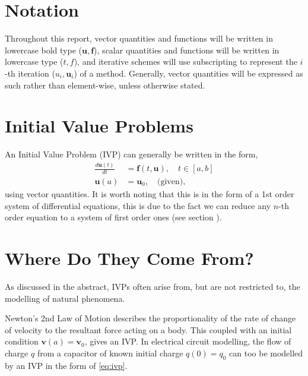 \documentclass[12pt, twoside]{report}
\theoremstyle{plain}
\theoremstyle{definition}
\theoremstyle{definition}
\begin{document}
    \section{Notation}
    \label{1_notation}
        Throughout this report, vector quantities and functions will be written
        in lowercase bold type ($\mathbf{u}, \mathbf{f}$), scalar quantities 
        and functions will be written in lowercase type ($t, f$), and iterative
        schemes will use subscripting to represent the $i$-th iteration 
        ($u_{i}, \mathbf{u}_i$) of a method. Generally, vector quantities will
        be expressed as such rather than element-wise, unless otherwise stated.


    \section{Initial Value Problems}
    \label{1_ivp}
        An Initial Value Problem (IVP) can generally be written in the form,
        \begin{equation}
        \label{eq:ivp}
            \begin{split}
                \frac{d \mathbf{u}(t)}{dt}& = \mathbf{f}(t, \mathbf{u}), 
                \quad t \in [a, b]\\
                \mathbf{u}(a)& = \mathbf{u}_0, \quad \text{(given)},
            \end{split}
        \end{equation}
        using vector quantities. It is worth noting that this is in the form of
        a 1st order system of differential equations, this is due to the fact 
        we can reduce any $n$-th order equation to a system of first order ones
        (see section ).


    \section{Where Do They Come From?}
    \label{1_origins}
        As discussed in the abstract, IVPs often arise from, but are not
        restricted to, the modelling of natural phenomena. 

        Newton's 2nd Law of Motion describes the proportionality of the rate 
        of change of velocity to the resultant force acting on a body. This 
        coupled with an initial condition $\mathbf{v}(a)=\mathbf{v}_0$, gives
        an IVP. In electrical circuit modelling, the flow of charge $q$ from a
        capacitor of known initial charge $q(0)=q_0$ can too be modelled by an 
        IVP in the form of \eqref{eq:ivp}.
\end{document}
